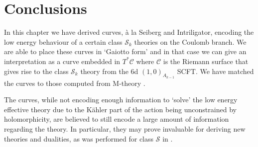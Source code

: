 \documentclass[main.tex]{subfiles}
\begin{document}
\section{Conclusions}
In this chapter we have derived curves, \`a la Seiberg and Intriligator, encoding the low energy behaviour of a certain class $\mathcal{S}_k$ theories on the Coulomb branch. We are able to place these curves in `Gaiotto form' and in that case we can give an interpretation as a curve embedded in $T^*\mathcal{C}$ where $\mathcal{C}$ is the Riemann surface that gives rise to the class $\mathcal{S}_k$ theory from the 6d $(1,0)_{A_{k-1}}$ SCFT. We have matched the curves to those computed from M-theory \cite{Coman:2015bqq}.

The curves, while not encoding enough information to `solve' the low energy effective theory due to the K\"ahler part of the action being unconstrained by holomorphicity, are believed to still encode a large amount of information regarding the theory. In particular, they may prove invaluable for deriving new theories and dualities, as was performed for class $\mathcal{S}$ in \cite{Gaiotto:2009we}.
\end{document}
